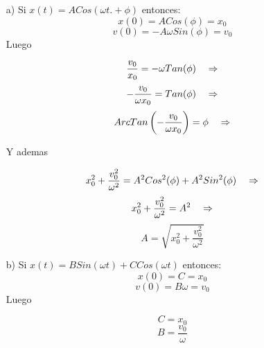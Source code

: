 \documentclass[a4paper]{article}
\begin{document}
     \begin{answer}[Problema 3.]
     
     \begin{enumerate}
\item[a)] Si $x(t) = ACos(\omega t. + \phi)$ entonces:
$$x(0) = ACos(\phi) = x_0$$ 
$$v(0) = -A\omega Sin(\phi) = v_0$$
Luego

$$\frac{v_0}{x_0} = -\omega Tan(\phi)\hspace{0.35cm}\Rightarrow$$
$$-\frac{v_0}{\omega x_0} =  Tan(\phi)\hspace{0.35cm}\Rightarrow$$
$$ArcTan\left(-\frac{v_0}{\omega x_0}\right) =  \phi\hspace{0.35cm}\Rightarrow$$

Y ademas 
 
$$x_0^2 + \frac{v_0^2}{\omega^2} = A^2Cos^2(\phi) + A^2Sin^2(\phi)\hspace{0.35cm}\Rightarrow $$ 
$$x_0^2 + \frac{v_0^2}{\omega^2} = A^2\hspace{0.35cm}\Rightarrow $$ 
$$A = \sqrt{x_0^2 + \frac{v_0^2}{\omega^2}}$$   

\item[b)] Si 
$x(t) = BSin(\omega t) + CCos(\omega t) $ entonces:
$$x(0) = C = x_0$$ 
$$v(0) = B\omega = v_0$$
Luego

$$C = x_0$$
$$B = \frac{v_0}{\omega}$$

\end{enumerate}
     \end{answer}
\end{document}
